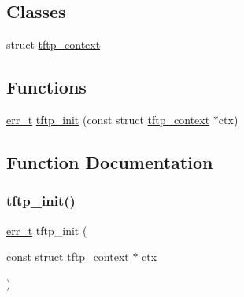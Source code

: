 \subsection*{Classes}
\begin{DoxyCompactItemize}
\item 
struct \hyperlink{structtftp__context}{tftp\+\_\+context}
\end{DoxyCompactItemize}
\subsection*{Functions}
\begin{DoxyCompactItemize}
\item 
\hyperlink{group__infrastructure__errors_gaf02d9da80fd66b4f986d2c53d7231ddb}{err\+\_\+t} \hyperlink{openmote-cc2538_2lwip_2src_2include_2lwip_2apps_2tftp__server_8h_a7a80673a1324da5c8ae2440af7b008a3}{tftp\+\_\+init} (const struct \hyperlink{structtftp__context}{tftp\+\_\+context} $\ast$ctx)
\end{DoxyCompactItemize}


\subsection{Function Documentation}
\mbox{\label{openmote-cc2538_2lwip_2src_2include_2lwip_2apps_2tftp__server_8h_a7a80673a1324da5c8ae2440af7b008a3}} 
\subsubsection{\texorpdfstring{tftp\+\_\+init()}{tftp\_init()}}
{\footnotesize\ttfamily \hyperlink{group__infrastructure__errors_gaf02d9da80fd66b4f986d2c53d7231ddb}{err\+\_\+t} tftp\+\_\+init (\begin{DoxyParamCaption}\item[{const struct \hyperlink{structtftp__context}{tftp\+\_\+context} $\ast$}]{ctx }\end{DoxyParamCaption})}

